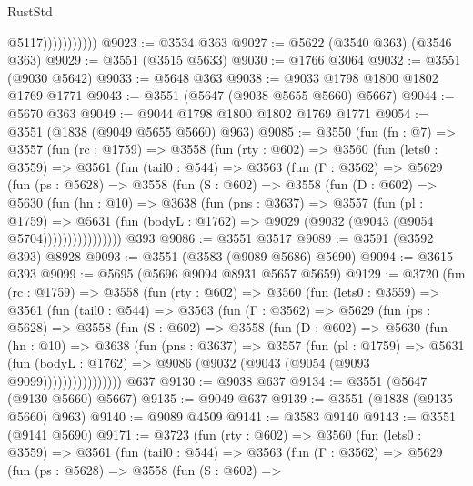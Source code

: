 \begin{lexlean}{RustStd}
\begin{coremodule}
                          @5117)))))))))))
@9023 := @3534 @363
@9027 := @5622 (@3540 @363) (@3546 @363)
@9029 := @3551 (@3515 @5633)
@9030 := @1766 @3064
@9032 := @3551 (@9030 @5642)
@9033 := @5648 @363
@9038 := @9033 @1798 @1800 @1802 @1769 @1771
@9043 := @3551 (@5647 (@9038 @5655 @5660) @5667)
@9044 := @5670 @363
@9049 := @9044 @1798 @1800 @1802 @1769 @1771
@9054 := @3551 (@1838 (@9049 @5655 @5660) @963)
@9085 := @3550
    (fun (fn : @7) =>
    @3557
      (fun (rc : @1759) =>
      @3558
        (fun (rty : @602) =>
        @3560
          (fun (lets0 : @3559) =>
          @3561
            (fun (tail0 : @544) =>
            @3563
              (fun (Γ : @3562) =>
              @5629
                (fun (ps : @5628) =>
                @3558
                  (fun (S : @602) =>
                  @3558
                    (fun (D : @602) =>
                    @5630
                      (fun (hn : @10) =>
                      @3638
                        (fun (pns : @3637) =>
                        @3557
                          (fun (pl : @1759) =>
                          @5631
                            (fun (bodyL : @1762) => @9029 (@9032 (@9043 (@9054 @5704))))))))))))))))
    @393
@9086 := @3551 @3517
@9089 := @3591 (@3592 @393) @8928
@9093 := @3551 (@3583 (@9089 @5686) @5690)
@9094 := @3615 @393
@9099 := @5695 (@5696 @9094 @8931 @5657 @5659)
@9129 := @3720
    (fun (rc : @1759) =>
    @3558
      (fun (rty : @602) =>
      @3560
        (fun (lets0 : @3559) =>
        @3561
          (fun (tail0 : @544) =>
          @3563
            (fun (Γ : @3562) =>
            @5629
              (fun (ps : @5628) =>
              @3558
                (fun (S : @602) =>
                @3558
                  (fun (D : @602) =>
                  @5630
                    (fun (hn : @10) =>
                    @3638
                      (fun (pns : @3637) =>
                      @3557
                        (fun (pl : @1759) =>
                        @5631
                          (fun (bodyL : @1762) =>
                          @9086 (@9032 (@9043 (@9054 (@9093 @9099))))))))))))))))
    @637
@9130 := @9038 @637
@9134 := @3551 (@5647 (@9130 @5660) @5667)
@9135 := @9049 @637
@9139 := @3551 (@1838 (@9135 @5660) @963)
@9140 := @9089 @4509
@9141 := @3583 @9140
@9143 := @3551 (@9141 @5690)
@9171 := @3723
    (fun (rty : @602) =>
    @3560
      (fun (lets0 : @3559) =>
      @3561
        (fun (tail0 : @544) =>
        @3563
          (fun (Γ : @3562) =>
          @5629
            (fun (ps : @5628) =>
            @3558
              (fun (S : @602) =>

\end{coremodule}
\end{lexlean}
